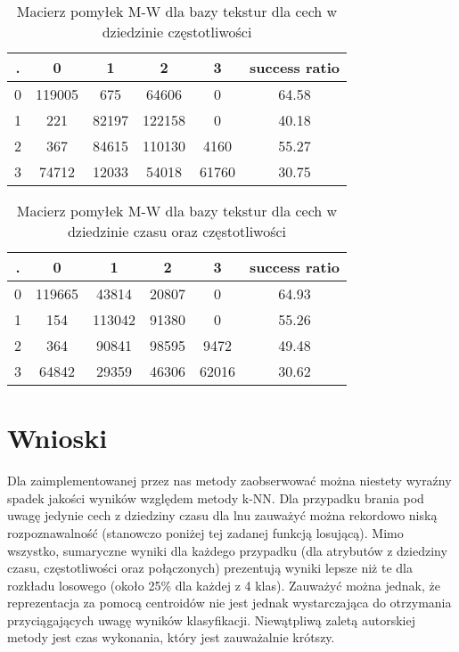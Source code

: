 \documentclass{classrep}
\begin{document}
\begin{table}[h!]
  \centering
  \caption{Macierz pomyłek M-W dla bazy tekstur dla cech w dziedzinie częstotliwości}
  \label{tab:tab1}
  \begin{tabular}{|c|c|c|c|c|c|}
    \hline
 . & 0 & 1 & 2 & 3 & success ratio \\
    \hline
 0 & 119005 & 675 & 64606 & 0 & 64.58\\
    \hline
 1 & 221 & 82197 & 122158 & 0 & 40.18\\
 \hline
 2 & 367 & 84615 & 110130 & 4160 & 55.27\\
 \hline
 3 & 74712 & 12033 & 54018 & 61760 & 30.75\\   
    \hline
  \end{tabular}
\end{table}

\begin{table}[h!]
  \centering
  \caption{Macierz pomyłek M-W dla bazy tekstur dla cech w dziedzinie czasu oraz częstotliwości}
  \label{tab:tab1}
  \begin{tabular}{|c|c|c|c|c|c|}
    \hline
 . & 0 & 1 & 2 & 3 & success ratio \\
    \hline
 0 & 119665 & 43814 & 20807 & 0 & 64.93\\
    \hline
 1 & 154 & 113042 & 91380 & 0 & 55.26\\
 \hline
 2 & 364 & 90841 & 98595 & 9472 & 49.48\\
 \hline
 3 & 64842 & 29359 & 46306 & 62016 & 30.62\\   
    \hline
  \end{tabular}
\end{table}


\section{Wnioski}

Dla zaimplementowanej przez nas metody zaobserwować można niestety wyraźny spadek jakości wyników względem metody k-NN. Dla przypadku brania pod uwagę jedynie cech z dziedziny czasu dla lnu zauważyć można rekordowo niską rozpoznawalność (stanowczo poniżej tej zadanej funkcją losującą). Mimo wszystko, sumaryczne wyniki dla każdego przypadku (dla atrybutów z dziedziny czasu, częstotliwości oraz połączonych) prezentują wyniki lepsze niż te dla rozkładu losowego (około 25\% dla każdej z 4 klas). Zauważyć można jednak, że reprezentacja za pomocą centroidów nie jest jednak wystarczająca do otrzymania przyciągających uwagę wyników klasyfikacji. Niewątpliwą zaletą autorskiej metody jest czas wykonania, który jest zauważalnie krótszy.
\end{document}
